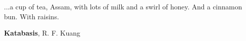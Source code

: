\cleardoublepage

\newpage
\null
\vfill

\vspace*{-2ex}
{ \slshape

    
    \begin{flushright}
        ...a cup of tea, Assam, with lots of milk and a swirl of honey. And a cinnamon bun. With raisins.

        \sffamily

        \textbf{Katabasis}, R. F. Kuang
    \end{flushright}
}

\vfill
